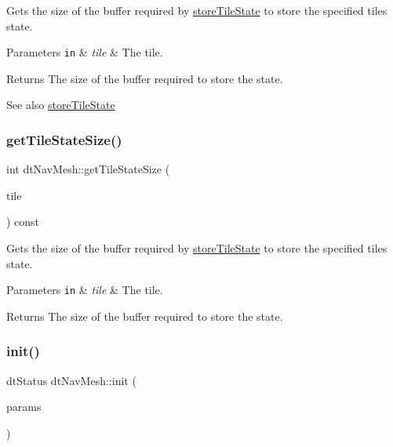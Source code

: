 Gets the size of the buffer required by \hyperlink{classdtNavMesh_a141e01263950382365468ea265f48758}{store\+Tile\+State} to store the specified tile\textquotesingle{}s state. 
\begin{DoxyParams}[1]{Parameters}
\mbox{\tt in}  & {\em tile} & The tile. \\
\hline
\end{DoxyParams}
\begin{DoxyReturn}{Returns}
The size of the buffer required to store the state.
\end{DoxyReturn}
\begin{DoxySeeAlso}{See also}
\hyperlink{classdtNavMesh_a141e01263950382365468ea265f48758}{store\+Tile\+State} 
\end{DoxySeeAlso}
\mbox{\label{classdtNavMesh_aaf6f0b0ce2bd81c5e6cd8ac67f6a8638}} 
\subsubsection{\texorpdfstring{get\+Tile\+State\+Size()}{getTileStateSize()}\hspace{0.1cm}{\footnotesize\ttfamily [2/2]}}
{\footnotesize\ttfamily int dt\+Nav\+Mesh\+::get\+Tile\+State\+Size (\begin{DoxyParamCaption}\item[{const \hyperlink{structdtMeshTile}{dt\+Mesh\+Tile} $\ast$}]{tile }\end{DoxyParamCaption}) const}

Gets the size of the buffer required by \hyperlink{classdtNavMesh_a141e01263950382365468ea265f48758}{store\+Tile\+State} to store the specified tile\textquotesingle{}s state. 
\begin{DoxyParams}[1]{Parameters}
\mbox{\tt in}  & {\em tile} & The tile. \\
\hline
\end{DoxyParams}
\begin{DoxyReturn}{Returns}
The size of the buffer required to store the state. 
\end{DoxyReturn}
\mbox{\label{classdtNavMesh_a020702938951249972b955a65967234a}} 
\subsubsection{\texorpdfstring{init()}{init()}\hspace{0.1cm}{\footnotesize\ttfamily [1/4]}}
{\footnotesize\ttfamily dt\+Status dt\+Nav\+Mesh\+::init (\begin{DoxyParamCaption}\item[{const \hyperlink{structdtNavMeshParams}{dt\+Nav\+Mesh\+Params} $\ast$}]{params }\end{DoxyParamCaption})}


